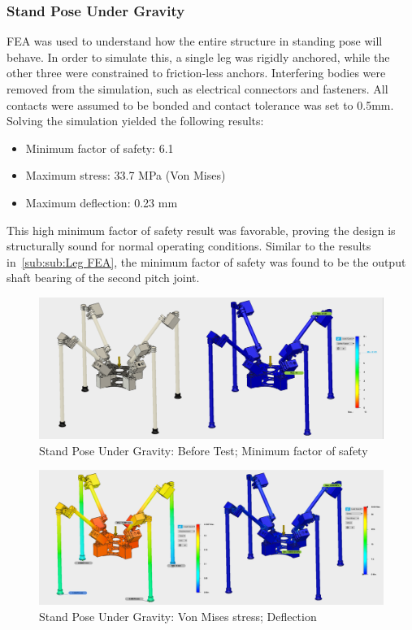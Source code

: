 \subsubsection{Stand Pose Under Gravity}\label{sub:sub:Stand FEA} FEA was used to understand how the entire structure in standing pose will behave. In order to simulate this, a single leg was rigidly anchored, while the other three were constrained to friction-less anchors. Interfering bodies were removed from the simulation, such as electrical connectors and fasteners. All contacts were assumed to be bonded and contact tolerance was set to 0.5mm.
Solving the simulation yielded the following results:
 \begin{itemize}
     \item Minimum factor of safety: 6.1
     \item Maximum stress: 33.7 MPa (Von Mises)
     \item Maximum deflection: 0.23 mm 
 \end{itemize}
 
This high minimum factor of safety result was favorable, proving the design is structurally sound for normal operating conditions. Similar to the results in~\ref{sub:sub:Leg FEA}, the minimum factor of safety was found to be the output shaft bearing of the second pitch joint.





 
\begin{figure}
\centering
\includegraphics[width=1.0\columnwidth]{./img/aquaShoko-v3dot3-FEA-Standing-1.png}
\caption{Stand Pose Under Gravity: Before Test; Minimum factor of safety }
\label{fig:test two pressure check}
\end{figure}

\begin{figure}[h]
\centering
\includegraphics[width=1.0\columnwidth]{./img/aquaShoko-v3dot3-FEA-Standing-2.png}
\caption{Stand Pose Under Gravity: Von Mises stress; Deflection}
\label{fig:PressureCheck2}
\end{figure}


